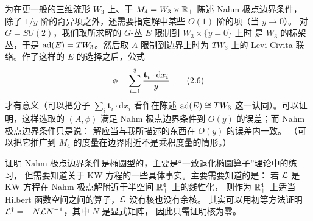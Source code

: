 
为在更一般的三维流形 $W_3$ 上、于 $M_4=W_3\times\mathbb{R}_+$ 陈述 Nahm 极点边界条件，
除了 $1/y$ 阶的奇异项之外，还需要指定解中某些 $O(1)$ 阶的项（当 $y\to 0$）。
对 $G=SU(2)$，我们取所求解的 $G$-丛 $E$ 限制到 $W_3\times\{y=0\}$ 上时
是 $W_3$ 的标架丛，于是 $\mathrm{ad}(E)=TW_3$。然后取 $A$ 限制到边界上时为
$TW_3$ 上的 Levi-Civita 联络。作了这样的 $E$ 的选择之后，公式
\begin{equation}\stepcounter{equation}
  \phi=\sum_{i=1}^{3}\frac{\mathbf{t}_i\cdot\mathrm{d}x_i}{y}
  \tag{2.6}\label{eq:2.6}
\end{equation}
才有意义（可以把分子 $\sum_i\mathbf{t}_i\cdot\mathrm{d}x_i$ 看作在陈述
$\mathrm{ad}(E)\cong TW_3$ 这一认同）。可以证明，这样选取的 $(A,\phi)$ 满足
Nahm 极点边界条件到 $O(y)$ 的误差；而 Nahm 极点边界条件只是说：
解应当与我所描述的东西在 $O(y)$ 的误差内一致。
（可以把它推广到 $M_4$ 的度量在边界附近不是乘积度量的情形。）


证明 Nahm 极点边界条件是椭圆型的，主要是“一致退化椭圆算子”理论中的练习，
但需要知道关于 KW 方程的一些具体事实。主要需要知道的是：
若 $\mathcal{L}$ 是 KW 方程在 Nahm 极点解附近于半空间 $\mathbb{R}^4_+$ 上的线性化，
则作为 $\mathbb{R}^4_+$ 上适当 Hilbert 函数空间之间的算子，$\mathcal{L}$ 没有核也没有余核。
其实可以用初等方法证明 $\mathcal{L}^{\dagger}=-N\mathcal{L} N^{-1}$，其中 $N$ 是显式矩阵，
因此只需证明核为零。


